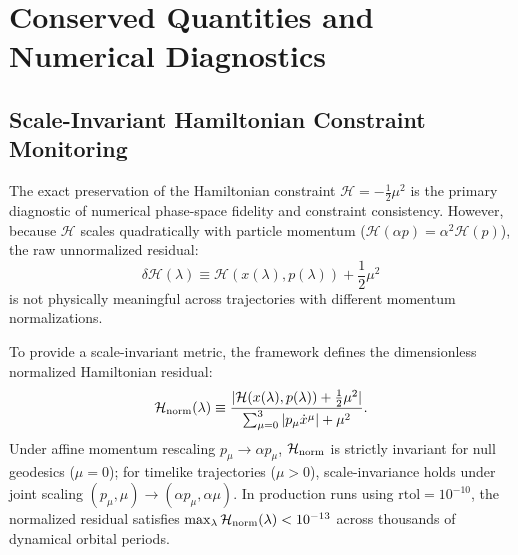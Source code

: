 \section{Conserved Quantities and Numerical Diagnostics}
\label{sec:conserved_quantities}

\subsection{Scale-Invariant Hamiltonian Constraint Monitoring}
The exact preservation of the Hamiltonian constraint $\mathcal{H} = -\frac{1}{2}\mu^2$ is the primary diagnostic of numerical phase-space fidelity and constraint consistency. However, because $\mathcal{H}$ scales quadratically with particle momentum ($\mathcal{H}(\alpha p) = \alpha^2 \mathcal{H}(p)$), the raw unnormalized residual:
\begin{equation}
    \delta\mathcal{H}(\lambda) \equiv \mathcal{H}(x(\lambda), p(\lambda)) + \frac{1}{2}\mu^2
    \label{eq:raw_hamiltonian_residual}
\end{equation}
is not physically meaningful across trajectories with different momentum normalizations.

To provide a scale-invariant metric, the framework defines the dimensionless normalized Hamiltonian residual:
\begin{equation}
    \mathcal{H}_{\rm norm}(\lambda) \equiv \frac{|\mathcal{H}(x(\lambda), p(\lambda)) + \frac{1}{2}\mu^2|}{\sum_{\mu=0}^3 |p_\mu \dot{x}^\mu| + \mu^2}.
    \label{eq:normalized_hamiltonian_residual}
\end{equation}
Under affine momentum rescaling $p_\mu \to \alpha p_\mu$, $\mathcal{H}_{\rm norm}$ is strictly invariant for null geodesics ($\mu = 0$); for timelike trajectories ($\mu > 0$), scale-invariance holds under joint scaling $(p_\mu, \mu) \to (\alpha p_\mu, \alpha \mu)$. In production runs using $\text{rtol} = 10^{-10}$, the normalized residual satisfies $\max_\lambda \mathcal{H}_{\rm norm}(\lambda) < 10^{-13}$ across thousands of dynamical orbital periods.

